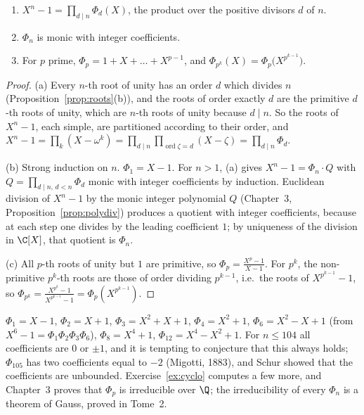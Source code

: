 \begin{proposition}\label{prop:cyclotomic}
\begin{enumerate}[label=(\alph*)]
\item $X^n-1=\prod_{d\mid n}\Phi_d(X)$, the product over the positive divisors $d$ of $n$.
\item $\Phi_n$ is monic with integer coefficients.
\item For $p$ prime, $\Phi_p=1+X+\dots+X^{p-1}$, and $\Phi_{p^k}(X)=\Phi_p\bigl(X^{p^{k-1}}\bigr)$.
\end{enumerate}
\end{proposition}
\begin{proof}
(a) Every $n$-th root of unity has an order $d$ which divides $n$ (Proposition~\ref{prop:roots}(b)), and the roots of order exactly $d$ are the primitive $d$-th roots of
unity, which are $n$-th roots of unity because $d\mid n$. So the roots of $X^n-1$, each simple, are partitioned according to their order, and
$X^n-1=\prod_k(X-\omega^k)=\prod_{d\mid n}\prod_{\operatorname{ord}\zeta=d}(X-\zeta)=\prod_{d\mid n}\Phi_d$.

(b) Strong induction on $n$. $\Phi_1=X-1$. For $n>1$, (a) gives $X^n-1=\Phi_n\cdot Q$ with $Q=\prod_{d\mid n,\,d<n}\Phi_d$ monic with integer
coefficients by induction. Euclidean division of $X^n-1$ by the monic integer polynomial $Q$ (Chapter~3, Proposition~\ref{prop:polydiv}) produces a
quotient with integer coefficients, because at each step one divides by the leading coefficient $1$; by uniqueness of the division in $\C[X]$, that quotient is $\Phi_n$.

(c) All $p$-th roots of unity but $1$ are primitive, so $\Phi_p=\frac{X^p-1}{X-1}$. For $p^k$, the non-primitive $p^k$-th roots are those of order dividing $p^{k-1}$,
i.e.\ the roots of $X^{p^{k-1}}-1$, so $\Phi_{p^k}=\frac{X^{p^k}-1}{X^{p^{k-1}}-1}=\Phi_p(X^{p^{k-1}})$.
\end{proof}

\begin{examplex}
$\Phi_1=X-1$, $\Phi_2=X+1$, $\Phi_3=X^2+X+1$, $\Phi_4=X^2+1$, $\Phi_6=X^2-X+1$ (from $X^6-1=\Phi_1\Phi_2\Phi_3\Phi_6$), $\Phi_8=X^4+1$,
$\Phi_{12}=X^4-X^2+1$. For $n\le104$ all coefficients are $0$ or $\pm1$, and it is tempting to conjecture that this always holds; $\Phi_{105}$ has two
coefficients equal to $-2$ (Migotti, 1883), and Schur showed that the coefficients are unbounded. Exercise~\ref{ex:cyclo} computes a few more, and Chapter~3 proves
that $\Phi_p$ is irreducible over $\Q$; the irreducibility of every $\Phi_n$ is a theorem of Gauss, proved in Tome~2.
\end{examplex}

